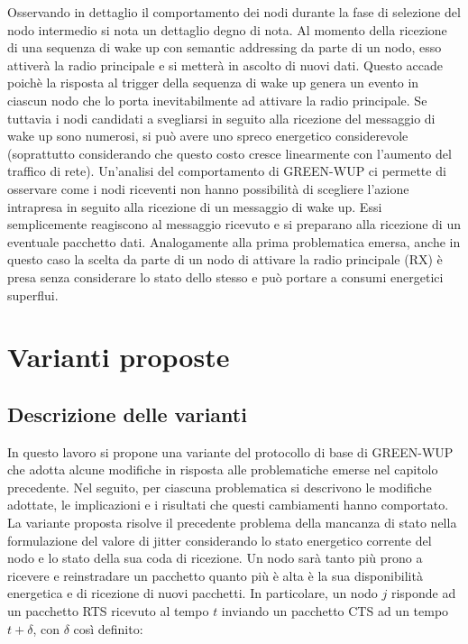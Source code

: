 \documentclass[binding=0.6cm,TFA]{sapthesis}
\begin{document}
Osservando in dettaglio il comportamento dei nodi durante la fase di selezione del nodo intermedio si nota un dettaglio degno di nota.
Al momento della ricezione di una sequenza di wake up con semantic addressing da parte di un nodo, esso attiverà la radio principale e si metterà in
ascolto di nuovi dati. Questo accade poichè la risposta al trigger della sequenza di wake up genera un evento in ciascun nodo che lo porta
inevitabilmente ad attivare la radio principale. Se tuttavia i nodi candidati a svegliarsi in seguito alla ricezione del messaggio di wake up sono
numerosi, si può avere uno spreco energetico considerevole (soprattutto considerando che questo costo cresce linearmente con l'aumento del traffico
di rete). Un'analisi del comportamento di GREEN-WUP ci permette di osservare come i nodi riceventi non hanno possibilità di scegliere l'azione
intrapresa in seguito alla ricezione di un messaggio di wake up. Essi semplicemente reagiscono al messaggio ricevuto e si preparano alla ricezione
di un eventuale pacchetto dati. Analogamente alla prima problematica emersa, anche in questo caso la scelta da parte di un nodo di attivare la
radio principale (RX) è presa senza considerare lo stato dello stesso e può portare a consumi energetici superflui.

\chapter{Varianti proposte}

\section{Descrizione delle varianti}

In questo lavoro si propone una variante del protocollo di base di GREEN-WUP che adotta alcune modifiche in risposta alle problematiche emerse nel capitolo
precedente. Nel seguito, per ciascuna problematica si descrivono le modifiche adottate, le implicazioni e i risultati che questi cambiamenti hanno comportato.\\

La variante proposta risolve il precedente problema della mancanza di stato nella formulazione del valore di jitter considerando lo stato energetico
corrente del nodo e lo stato della sua coda di ricezione. Un nodo sarà tanto più prono a ricevere e reinstradare un pacchetto quanto
più è alta è la sua disponibilità energetica e di ricezione di nuovi pacchetti. In particolare, un nodo $j$ risponde ad un pacchetto RTS ricevuto al
tempo $t$ inviando un pacchetto CTS ad un tempo $t+\delta$, con $\delta$ così definito:
\end{document}
